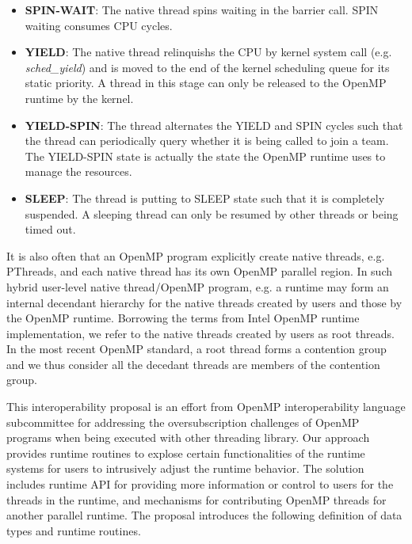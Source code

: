 \begin{itemize}
	\item {\bf SPIN-WAIT}: The native thread spins waiting in the barrier call. 
		SPIN waiting consumes CPU cycles.
	\item {\bf YIELD}: The native thread relinquishs the CPU by kernel system call (e.g. {\em sched\_yield}) 
		and is moved to the end of the kernel scheduling queue for its static priority. A thread in this 
		stage can only be released to the OpenMP runtime by the kernel. 
	\item {\bf YIELD-SPIN}: The thread alternates the YIELD and SPIN cycles such that the thread can 
		periodically query whether it is being called to join a team. The YIELD-SPIN state is actually the 
		state the OpenMP runtime uses to manage the resources. 
	\item {\bf SLEEP}: The thread is putting to SLEEP state such that it is completely suspended. A sleeping
		thread can only be resumed by other threads or being timed out. 
\end{itemize}
It is also often that an OpenMP program explicitly create native threads, e.g. PThreads, and each native thread has
its own OpenMP {\sf parallel} region. 
In such hybrid user-level native thread/OpenMP program, e.g. 
a runtime may form an internal decendant hierarchy for the native threads created by users and
those by the OpenMP runtime. Borrowing the terms from Intel OpenMP runtime implementation, we refer to 
the native threads created by users as root threads. 
In the most recent OpenMP standard, a root thread forms a contention group and we thus 
consider all the decedant threads are members of the contention group. 


This interoperability proposal is an effort from OpenMP interoperability language subcommittee for addressing
the oversubscription challenges of OpenMP programs when being executed with other threading library. 
Our approach provides runtime routines to explose certain functionalities of the runtime systems for users to 
intrusively adjust the runtime behavior. 
The solution includes runtime API for providing more information or control to users 
for the threads in the runtime, 
and mechanisms for 
contributing OpenMP threads for another parallel runtime. 
The proposal introduces the following definition of data types and runtime routines. 

